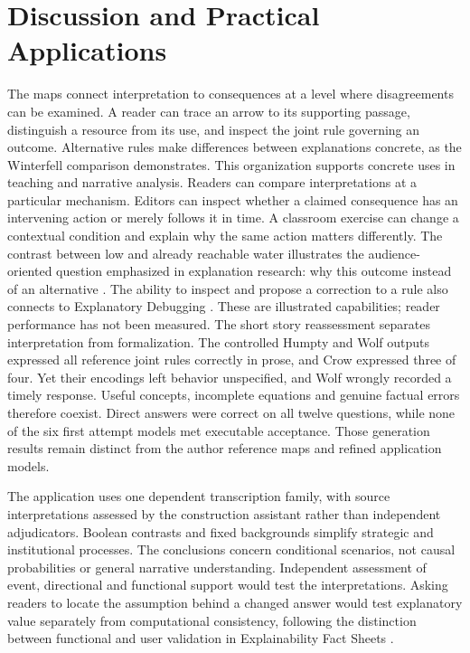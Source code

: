 \documentclass{svproc}
\begin{document}
\section{Discussion and Practical Applications}
The maps connect interpretation to consequences at a level where disagreements can be examined. A reader can trace an arrow to its supporting passage, distinguish a resource from its use, and inspect the joint rule governing an outcome. Alternative rules make differences between explanations concrete, as the Winterfell comparison demonstrates.
This organization supports concrete uses in teaching and narrative analysis. Readers can compare interpretations at a particular mechanism. Editors can inspect whether a claimed consequence has an intervening action or merely follows it in time. A classroom exercise can change a contextual condition and explain why the same action matters differently. The contrast between low and already reachable water illustrates the audience-oriented question emphasized in explanation research: why this outcome instead of an alternative \cite{miller2019}. The ability to inspect and propose a correction to a rule also connects to Explanatory Debugging \cite{kulesza2015}. These are illustrated capabilities; reader performance has not been measured.
The short story reassessment separates interpretation from formalization. The controlled Humpty and Wolf outputs expressed all reference joint rules correctly in prose, and Crow expressed three of four. Yet their encodings left behavior unspecified, and Wolf wrongly recorded a timely response. Useful concepts, incomplete equations and genuine factual errors therefore coexist. Direct answers were correct on all twelve questions, while none of the six first attempt models met executable acceptance. Those generation results remain distinct from the author reference maps and refined application models.

The application uses one dependent transcription family, with source interpretations assessed by the construction assistant rather than independent adjudicators. Boolean contrasts and fixed backgrounds simplify strategic and institutional processes. The conclusions concern conditional scenarios, not causal probabilities or general narrative understanding. Independent assessment of event, directional and functional support would test the interpretations. Asking readers to locate the assumption behind a changed answer would test explanatory value separately from computational consistency, following the distinction between functional and user validation in Explainability Fact Sheets \cite{sokol2020}.
\end{document}
